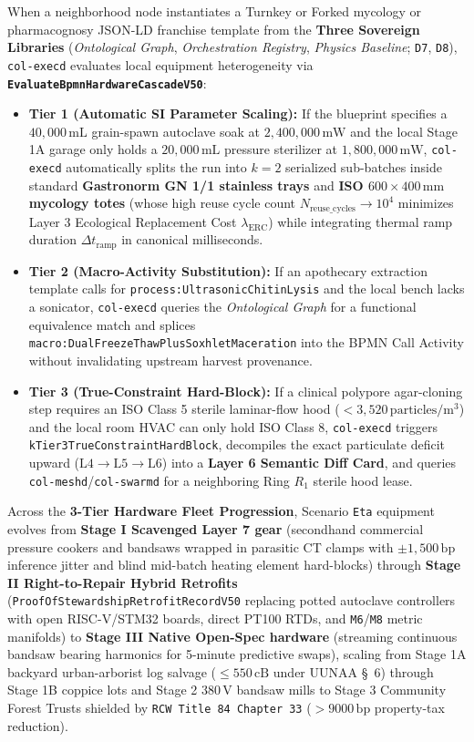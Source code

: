 When a neighborhood node instantiates a Turnkey or Forked mycology or pharmacognosy JSON-LD franchise template from the \textbf{Three Sovereign
Libraries} (\textit{Ontological Graph}, \textit{Orchestration Registry}, \textit{Physics Baseline}; \texttt{D7}, \texttt{D8}), \texttt{col-execd}
evaluates local equipment heterogeneity via \textbf{\texttt{EvaluateBpmnHardwareCascadeV50}}:
\begin{itemize}
    \item \textbf{Tier 1 (Automatic SI Parameter Scaling):} If the blueprint specifies a $40{,}000\,\mathrm{mL}$ grain-spawn autoclave soak at
    $2{,}400{,}000\,\mathrm{mW}$ and the local Stage 1A garage only holds a $20{,}000\,\mathrm{mL}$ pressure sterilizer at $1{,}800{,}000\,\mathrm{mW}$,
    \texttt{col-execd} automatically splits the run into $k = 2$ serialized sub-batches inside standard \textbf{Gastronorm GN 1/1 stainless trays} and
    \textbf{ISO $600\times 400\,\mathrm{mm}$ mycology totes} (whose high reuse cycle count $N_{\mathrm{reuse\_cycles}} \to 10^4$ minimizes Layer 3
    Ecological Replacement Cost $\lambda_{\mathrm{ERC}}$) while integrating thermal ramp duration $\Delta t_{\mathrm{ramp}}$ in canonical milliseconds.
    \item \textbf{Tier 2 (Macro-Activity Substitution):} If an apothecary extraction template calls for \texttt{process:UltrasonicChitinLysis} and the
    local bench lacks a sonicator, \texttt{col-execd} queries the \textit{Ontological Graph} for a functional equivalence match and splices
    \texttt{macro:DualFreezeThawPlusSoxhletMaceration} into the BPMN Call Activity without invalidating upstream harvest provenance.
    \item \textbf{Tier 3 (True-Constraint Hard-Block):} If a clinical polypore agar-cloning step requires an ISO Class 5 sterile laminar-flow hood
    ($< 3{,}520\,\mathrm{particles/m^3}$) and the local room HVAC can only hold ISO Class 8, \texttt{col-execd} triggers
    \texttt{kTier3TrueConstraintHardBlock}, decompiles the exact particulate deficit upward ($\mathrm{L4} \to \mathrm{L5} \to \mathrm{L6}$) into a
    \textbf{Layer 6 Semantic Diff Card}, and queries \texttt{col-meshd}/\texttt{col-swarmd} for a neighboring Ring $R_1$ sterile hood lease.
\end{itemize}
Across the \textbf{3-Tier Hardware Fleet Progression}, Scenario \texttt{Eta} equipment evolves from \textbf{Stage I Scavenged Layer 7 gear}
(secondhand commercial pressure cookers and bandsaws wrapped in parasitic CT clamps with $\pm 1{,}500\,\mathrm{bp}$ inference jitter and blind
mid-batch heating element hard-blocks) through \textbf{Stage II Right-to-Repair Hybrid Retrofits} (\texttt{ProofOfStewardshipRetrofitRecordV50}
replacing potted autoclave controllers with open RISC-V/STM32 boards, direct PT100 RTDs, and \texttt{M6}/\texttt{M8} metric manifolds) to
\textbf{Stage III Native Open-Spec hardware} (streaming continuous bandsaw bearing harmonics for 5-minute predictive swaps), scaling from Stage 1A
backyard urban-arborist log salvage ($\le 550\,\mathrm{cB}$ under UUNAA \S~6) through Stage 1B coppice lots and Stage 2 $380\,\mathrm{V}$ bandsaw
mills to Stage 3 Community Forest Trusts shielded by \texttt{RCW Title 84 Chapter 33} ($> 9000\,\mathrm{bp}$ property-tax reduction).

